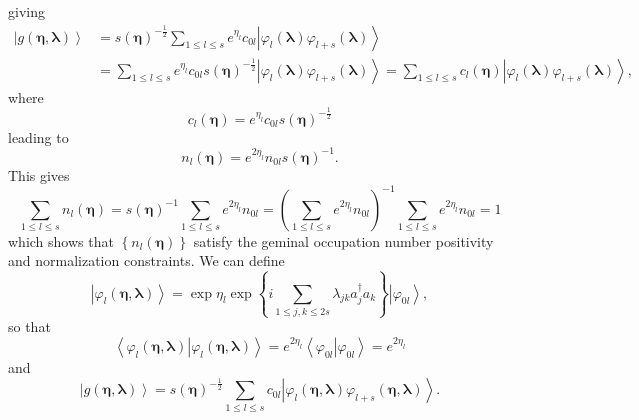 \documentclass[aps,preprint]{revtex4}%
\begin{document}
giving
\begin{align}
\left\vert g\left(  \boldsymbol{\eta},\boldsymbol{\lambda}\right)
\right\rangle  &  =\mathit{s}\left(  \boldsymbol{\eta}\right)  ^{-\frac{1}{2}%
}\sum_{1\leq l\leq s}e^{\eta_{l}}c_{0l}\left\vert \varphi_{l}\left(
\boldsymbol{\lambda}\right)  \varphi_{l+s}\left(  \boldsymbol{\lambda}\right)
\right\rangle \nonumber\\
&  =\sum_{1\leq l\leq s}e^{\eta_{l}}c_{0l}\mathit{s}\left(  \boldsymbol{\eta
}\right)  ^{-\frac{1}{2}}\left\vert \varphi_{l}\left(  \boldsymbol{\lambda
}\right)  \varphi_{l+s}\left(  \boldsymbol{\lambda}\right)  \right\rangle
=\sum_{1\leq l\leq s}c_{l}\left(  \boldsymbol{\eta}\right)  \left\vert
\varphi_{l}\left(  \boldsymbol{\lambda}\right)  \varphi_{l+s}\left(
\boldsymbol{\lambda}\right)  \right\rangle ,
\end{align}
where
\begin{equation}
c_{l}\left(  \boldsymbol{\eta}\right)  =e^{\eta_{l}}c_{0l}\mathit{s}\left(
\boldsymbol{\eta}\right)  ^{-\frac{1}{2}}%
\end{equation}
leading to
\begin{equation}
n_{l}\left(  \boldsymbol{\eta}\right)  =e^{2\eta_{l}}n_{0l}\mathit{s}\left(
\boldsymbol{\eta}\right)  ^{-1}.
\end{equation}
This gives
\begin{equation}
\sum_{1\leq l\leq s}n_{l}\left(  \boldsymbol{\eta}\right)  =\mathit{s}\left(
\boldsymbol{\eta}\right)  ^{-1}\sum_{1\leq l\leq s}e^{2\eta_{l}}n_{0l}=\left(
\sum_{1\leq l\leq s}e^{2\eta_{l}}n_{0l}\right)  ^{-1}\sum_{1\leq l\leq
s}e^{2\eta_{l}}n_{0l}=1
\end{equation}
which shows that $\left\{  n_{l}\left(  \boldsymbol{\eta}\right)  \right\}  $
satisfy the geminal occupation number positivity and normalization
constraints. We can define%
\begin{equation}
\left\vert \varphi_{l}\left(  \boldsymbol{\eta,\lambda}\right)  \right\rangle
=\exp\eta_{l}\exp\left\{  i\sum_{1\leq j,k\leq2s}\lambda_{jk}a_{j}^{\dagger
}a_{k}\right\}  \left\vert \varphi_{0l}\right\rangle ,
\end{equation}
so that
\begin{equation}
\left\langle \left.  \varphi_{l}\left(  \boldsymbol{\eta,\lambda}\right)
\right\vert \varphi_{l}\left(  \boldsymbol{\eta,\lambda}\right)  \right\rangle
=e^{2\eta_{l}}\left\langle \left.  \varphi_{0l}\right\vert \varphi
_{0l}\right\rangle =e^{2\eta_{l}}%
\end{equation}
and
\begin{equation}
\left\vert g\left(  \boldsymbol{\eta},\boldsymbol{\lambda}\right)
\right\rangle =\mathit{s}\left(  \boldsymbol{\eta}\right)  ^{-\frac{1}{2}}%
\sum_{1\leq l\leq s}c_{0l}\left\vert \varphi_{l}\left(  \boldsymbol{\eta
,\lambda}\right)  \varphi_{l+s}\left(  \boldsymbol{\eta,\lambda}\right)
\right\rangle .
\end{equation}
\end{document}
